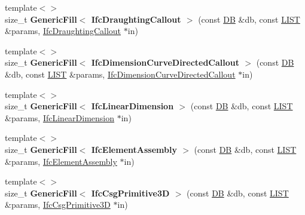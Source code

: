 \begin{DoxyCompactItemize}
\item 
\hypertarget{namespace_assimp_1_1_s_t_e_p_a1acb6f08768c52bd2d954d221687da3d}{{\footnotesize template$<$$>$ }\\size\+\_\+t {\bfseries Generic\+Fill$<$ Ifc\+Draughting\+Callout $>$} (const \hyperlink{class_assimp_1_1_s_t_e_p_1_1_d_b}{D\+B} \&db, const \hyperlink{class_assimp_1_1_s_t_e_p_1_1_e_x_p_r_e_s_s_1_1_l_i_s_t}{L\+I\+S\+T} \&params, \hyperlink{struct_assimp_1_1_i_f_c_1_1_ifc_draughting_callout}{Ifc\+Draughting\+Callout} $\ast$in)}\label{namespace_assimp_1_1_s_t_e_p_a1acb6f08768c52bd2d954d221687da3d}

\item 
\hypertarget{namespace_assimp_1_1_s_t_e_p_ae3438d63a7e4bc53f6d4dd9790d6c4e6}{{\footnotesize template$<$$>$ }\\size\+\_\+t {\bfseries Generic\+Fill$<$ Ifc\+Dimension\+Curve\+Directed\+Callout $>$} (const \hyperlink{class_assimp_1_1_s_t_e_p_1_1_d_b}{D\+B} \&db, const \hyperlink{class_assimp_1_1_s_t_e_p_1_1_e_x_p_r_e_s_s_1_1_l_i_s_t}{L\+I\+S\+T} \&params, \hyperlink{struct_assimp_1_1_i_f_c_1_1_ifc_dimension_curve_directed_callout}{Ifc\+Dimension\+Curve\+Directed\+Callout} $\ast$in)}\label{namespace_assimp_1_1_s_t_e_p_ae3438d63a7e4bc53f6d4dd9790d6c4e6}

\item 
\hypertarget{namespace_assimp_1_1_s_t_e_p_adb48fb6d6690d2003ea84b0ec30ab1e1}{{\footnotesize template$<$$>$ }\\size\+\_\+t {\bfseries Generic\+Fill$<$ Ifc\+Linear\+Dimension $>$} (const \hyperlink{class_assimp_1_1_s_t_e_p_1_1_d_b}{D\+B} \&db, const \hyperlink{class_assimp_1_1_s_t_e_p_1_1_e_x_p_r_e_s_s_1_1_l_i_s_t}{L\+I\+S\+T} \&params, \hyperlink{struct_assimp_1_1_i_f_c_1_1_ifc_linear_dimension}{Ifc\+Linear\+Dimension} $\ast$in)}\label{namespace_assimp_1_1_s_t_e_p_adb48fb6d6690d2003ea84b0ec30ab1e1}

\item 
\hypertarget{namespace_assimp_1_1_s_t_e_p_a720f2b90a962c163ac36708cd1d7ab49}{{\footnotesize template$<$$>$ }\\size\+\_\+t {\bfseries Generic\+Fill$<$ Ifc\+Element\+Assembly $>$} (const \hyperlink{class_assimp_1_1_s_t_e_p_1_1_d_b}{D\+B} \&db, const \hyperlink{class_assimp_1_1_s_t_e_p_1_1_e_x_p_r_e_s_s_1_1_l_i_s_t}{L\+I\+S\+T} \&params, \hyperlink{struct_assimp_1_1_i_f_c_1_1_ifc_element_assembly}{Ifc\+Element\+Assembly} $\ast$in)}\label{namespace_assimp_1_1_s_t_e_p_a720f2b90a962c163ac36708cd1d7ab49}

\item 
\hypertarget{namespace_assimp_1_1_s_t_e_p_a256756b41269a7290fdacd2be6766cbb}{{\footnotesize template$<$$>$ }\\size\+\_\+t {\bfseries Generic\+Fill$<$ Ifc\+Csg\+Primitive3\+D $>$} (const \hyperlink{class_assimp_1_1_s_t_e_p_1_1_d_b}{D\+B} \&db, const \hyperlink{class_assimp_1_1_s_t_e_p_1_1_e_x_p_r_e_s_s_1_1_l_i_s_t}{L\+I\+S\+T} \&params, \hyperlink{struct_assimp_1_1_i_f_c_1_1_ifc_csg_primitive3_d}{Ifc\+Csg\+Primitive3\+D} $\ast$in)}\label{namespace_assimp_1_1_s_t_e_p_a256756b41269a7290fdacd2be6766cbb}


\end{DoxyCompactItemize}
